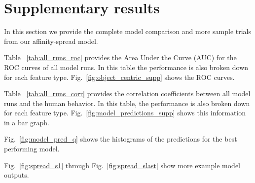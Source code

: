 \documentclass{article}
\begin{document}

% 



\section{Supplementary results}

In this section we provide the complete model comparison and more sample trials from our affinity-spread model.

Table ~\ref{tab:all_runs_roc} provides the Area Under the Curve (AUC) for the ROC curves of all model runs. In this table the performance is also broken down for each feature type. Fig.~\ref{fig:object_centric_supp} shows the ROC curves.

Table ~\ref{tab:all_runs_corr} provides the correlation coefficients between all model runs and the human behavior. In this table, the performance is also broken down for each feature type. Fig.~\ref{fig:model_predictions_supp} shows this information in a bar graph.


Fig.~\ref{fig:model_pred_q} shows the histograms of the predictions for the best performing model. 

Fig.~\ref{fig:spread_s1} through Fig.~\ref{fig:spread_slast} show more example model outputs. 
\end{document}
